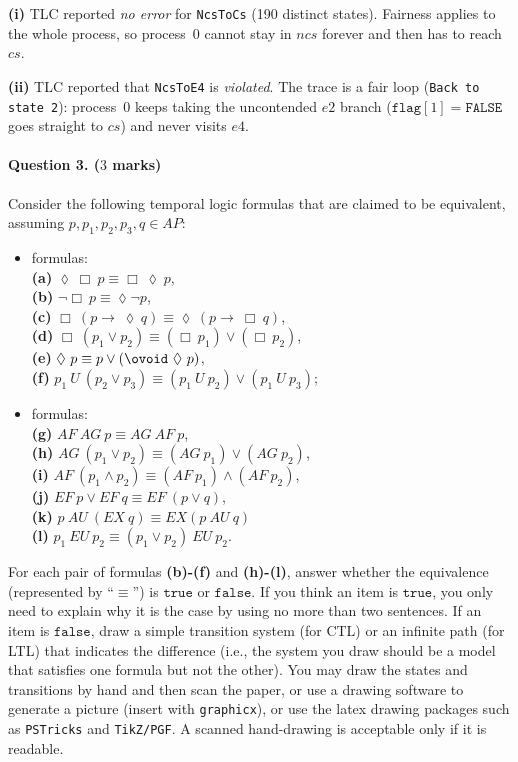 \documentclass{article}
\newcommand{\true}{\texttt{true}}
\newcommand{\false}{\texttt{false}}
\renewcommand{\diamond}{\lozenge} %
\newcommand{\Next}{\ovoid} %
\begin{document}
\textbf{(i)} TLC reported \emph{no error} for \texttt{NcsToCs} (190 distinct states). Fairness applies to the whole process, so process~$0$ cannot stay in $ncs$ forever and then has to reach $cs$.

\textbf{(ii)} TLC reported that \texttt{NcsToE4} is \emph{violated}. The trace is a fair loop (\texttt{Back to state 2}): process~$0$ keeps taking the uncontended $e2$ branch ($\texttt{flag}[1]=\texttt{FALSE}$ goes straight to $cs$) and never visits $e4$.

\bigskip \bigskip

\paragraph{Question 3. ($3$ marks)} Consider the following temporal logic formulas that are claimed to be equivalent, assuming $p, p_1, p_2, p_3, q\in AP$:

\begin{itemize}
    \item[$LTL$] formulas:\\ \textbf{(a)} $\diamond\ \Box\ p\equiv\Box\ \diamond\ p$, \\
    \textbf{(b)} $\neg\Box\ p\equiv\diamond\neg p$, \\
    \textbf{(c)} $\Box\ (p\rightarrow\ \diamond\ q) \equiv \diamond\ (p\rightarrow\ \Box\ q)$, \\
    \textbf{(d)} $\Box\ (p_1\vee p_2)\equiv (\Box\ p_1)\vee(\Box\ p_2)$, \\
    \textbf{(e)} $\diamond\ p\equiv p\vee(\Next\ \diamond\ p)$, \\
    \textbf{(f)} $p_1\ U\ (p_2\vee p_3)\equiv(p_1\ U\ p_2)\vee(p_1\ U\ p_3)$; 
    \item[$CTL$] formulas: \\
    \textbf{(g)} $AF\ AG\ p\equiv AG\ AF\ p$, \\
    \textbf{(h)} $AG\ (p_1\vee p_2) \equiv (AG\ p_1)\vee(AG\ p_2)$, \\
    \textbf{(i)} $AF\ (p_1\wedge p_2) \equiv (AF\ p_1)\wedge(AF\ p_2)$, \\
    \textbf{(j)} $EF\ p\vee EF\ q\equiv EF\ (p\vee q)$,\\
    \textbf{(k)} $p\ AU\ (EX\ q)\equiv EX (p\ AU\ q)$\\
    \textbf{(l)} $p_1\ EU\ p_2\equiv (p_1\vee p_2)\ EU\ p_2$.
\end{itemize}

\bigskip

For each pair of formulas \textbf{(b)-(f)} and \textbf{(h)-(l)}, answer whether the equivalence (represented by ``$\equiv$'') is $\true$ or $\false$. If you think an item is $\true$, you only need to explain why it is the case by using no more than two sentences. If an item is $\false$, draw a simple transition system (for CTL) or an infinite path (for LTL) that indicates the difference (i.e., the system you draw should be a model that satisfies one formula but not the other). You may draw the states and transitions by hand and then scan the paper, or use a drawing software to generate a picture (insert with \texttt{graphicx}), or use the latex drawing packages such as \texttt{PSTricks} and \texttt{TikZ/PGF}. A scanned hand-drawing is acceptable only if it is readable.
\end{document}
